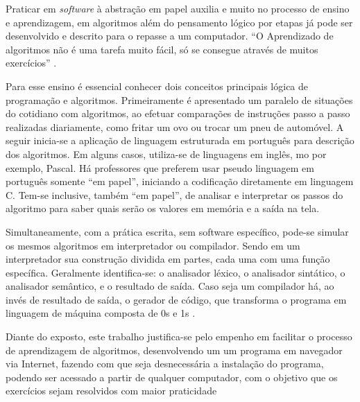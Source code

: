 \ifdraft{\color{green}}{}Praticar em \textit{software} à abstração em papel auxilia e muito no processo de ensino e aprendizagem, em algoritmos além do pensamento lógico por etapas já pode ser desenvolvido e descrito para o repasse a um computador.
``O Aprendizado de algoritmos não é uma tarefa muito fácil, só se consegue através de muitos exercícios'' \cite[p.~1]{lopes2002etal}.

Para esse ensino é essencial conhecer dois conceitos principais lógica de programação e algoritmos. Primeiramente é apresentado um paralelo de situações do cotidiano com algoritmos, ao efetuar comparações de instruções passo a passo realizadas diariamente, como fritar um ovo ou trocar um pneu de automóvel. A seguir inicia-se a aplicação de linguagem estruturada em português para descrição dos algoritmos. Em alguns casos, utiliza-se de linguagens em inglês, mo por exemplo, Pascal. Há professores que preferem usar pseudo linguagem em português somente ``em papel'', iniciando a codificação diretamente em linguagem C. Tem-se inclusive, também ``em papel'', de analisar e interpretar os passos do algoritmo para saber quais serão os valores em memória e a saída na tela.

Simultaneamente, com a prática escrita, sem software específico, pode-se simular os mesmos algoritmos em interpretador ou compilador. Sendo em um interpretador sua construção dividida em partes, cada uma com uma função específica. Geralmente identifica-se: o analisador léxico, o analisador sintático, o analisador semântico, e o resultado de saída. Caso seja um compilador há, ao invés de resultado de saída, o gerador de código, que transforma o programa em linguagem de máquina composta de 0s e 1s \cite{delamaro2004}.

Diante do exposto, este trabalho justifica-se pelo empenho em facilitar o processo de aprendizagem de algoritmos, desenvolvendo um um programa em navegador via Internet, fazendo com que seja desnecessária a instalação do programa,  podendo ser acessado a partir de qualquer computador, com o objetivo que os exercícios sejam resolvidos com maior praticidade\color{black}
